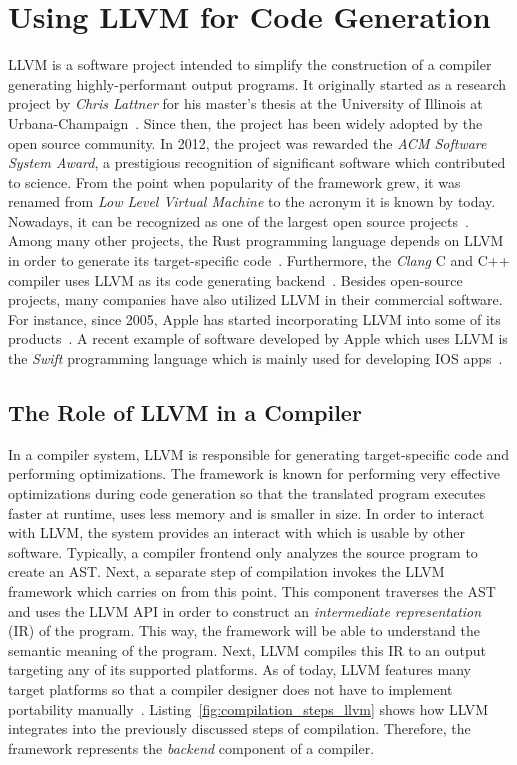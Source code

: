 \section{Using LLVM for Code Generation}

LLVM is a software project intended to simplify the construction of a compiler generating highly-performant output programs.
It originally started as a research project by \emph{Chris Lattner} for his master's thesis at the University of Illinois at Urbana-Champaign~\cite{Lattner:MSThesis02}.
Since then, the project has been widely adopted by the open source community.
In 2012, the project was rewarded the \emph{ACM Software System Award}, a prestigious recognition of significant software which contributed to science.
From the point when popularity of the framework grew, it was renamed from \emph{Low Level Virtual Machine} to the acronym it is known by today.
Nowadays, it can be recognized as one of the largest open source projects~\cite[preface]{Cardoso_Lopes2014-jt}.
Among many other projects, the Rust programming language depends on LLVM in order to generate its target-specific code~\cite[p.~373]{McNamara2021-hz}.
Furthermore, the \emph{Clang} C and C++ compiler uses LLVM as its code generating backend~\cite[preface]{Hsu2021-ez}.
Besides open-source projects, many companies have also utilized LLVM in their commercial software.
For instance, since 2005, Apple has started incorporating LLVM into some of its products~\cite[pp.~11-15]{Fandrey}.
A recent example of software developed by Apple which uses LLVM is the \emph{Swift} programming language which is mainly used for developing IOS apps~\cite[preface]{Hsu2021-ez}.

\subsection{The Role of LLVM in a Compiler}

In a compiler system, LLVM is responsible for generating target-specific code and performing optimizations.
The framework is known for performing very effective optimizations during code generation so that the translated program executes faster at runtime, uses less memory and is smaller in size.
In order to interact with LLVM, the system provides an interact with which is usable by other software\@.
Typically, a compiler frontend only analyzes the source program to create an AST\@.
Next, a separate step of compilation invokes the LLVM framework which carries on from this point\@.
This component traverses the AST and uses the LLVM API in order to construct an \emph{intermediate representation} (IR) of the program.
This way, the framework will be able to understand the semantic meaning of the program.
Next, LLVM compiles this IR to an output targeting any of its supported platforms.
As of today, LLVM features many target platforms so that a compiler designer does not have to implement portability manually~\cite[preface]{Hsu2021-ez}.
Listing~\ref{fig:compilation_steps_llvm} shows how LLVM integrates into the previously discussed steps of compilation.
Therefore, the framework represents the \emph{backend} component of a compiler.

